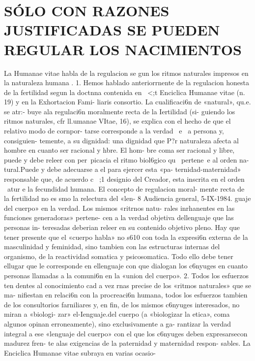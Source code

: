 \documentclass[letterpaper]{report}
\begin{document}
	{\centering
		\section{S\'OLO CON RAZONES JUSTIFICADAS SE PUEDEN REGULAR LOS NACIMIENTOS}
	}
	La Humanae vitae habla de la regulacion 
se gun los ritmos naturales impresos 
en la naturaleza humana 	. 
1. Hemos hablado anteriorrnente de la regulacion 
honesta de la fertilidad segun la doctnna contenida en ~<;t 
Enciclica Humanae vitae (n. 19) y en la Exhortacion Fami- 
liaris consortio. La cualificaci6n de «natural», qu.e. se atr:- 
buye ala regulaci6n moralmente recta de la Iertilidad (si- 
guiendo los ritmos naturales, cfr ll.umanae VItae, 16), se 
explica con el hecho de que el relativo modo de cornpor- 
tarse corresponde a la verdad ~e ~a persona y, consiguien- 
temente, a su dignidad: una dignidad que P?r naturaleza 
afecta al hombre en cuanto ser racional y hbre. El hom- 
bre coma ser racional y libre, puede y debe releer con 
per~picacia el ritmo biol6gico qu~ pertene~e al orden na- 
tural.Puede y debe adecuarse a el para ejercer esta «pa- 
ternidad-maternidad» responsable que, de acuerdo c~ ;1 
designio del Creador, esta inscrita en el orden ~atur e 
la fecundidad humana. El concepto de regulacion moral- 
mente recta de la fertilidad no es smo la relectura del «len- 
8 Audiencia general, 5-IX-1984. 
guaje del cuerpo» en la verdad. Los mismos «ritrnos natu- 
rales inrhanentes en las funciones generadoras» pertene- 
cen a la verdad objetiva dellenguaje que las personas in- 
teresadas deberian releer en su contenido objetivo pleno. 
Hay que tener presente que el «cuerpo habla» no s610 con 
toda la expresi6n externa de la masculinidad y feminidad, 
sino tambien con las estructuras internas del organismo, 
de la reactividad somatica y psicosomatica. Todo ello debe 
tener ellugar que le corresponde en ellenguaje con que 
dialogan los c6nyuges en cuanto personas llamadas a la 
comuni6n en la «union del cuerpo». 
2. Todos los esfuerzos ten dentes al conocimiento 
cad a vez rnas precise de los «ritmos naturales» que se ma- 
nifiestan en relaci6n con la procreaci6n humana, todos los 
esfuerzos tambien de los consultorios farniliares y, en fin, 
de los mismos c6nyuges interesados, no miran a «biologi- 
zar» el-Ienguaje.del cuerpo (a «biologizar la etica», coma 
algunos opinan erroneamente), sino exclusivamente a ga- 
rantizar la verdad integral a ese «lenguaje del cuerpo» con 
el que los c6nyuges deben expresarsecon madurez fren- 
te alas exigencias de la paternidad y maternidad respon- 
sables. 
La Enciclica Humanae vitae subraya en varias ocasio- 
\end{document}
